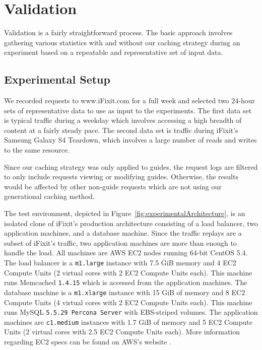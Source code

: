 \documentclass[12pt]{ucthesis}
\begin{document}
\chapter{Validation} \label{validation}
Validation is a fairly straightforward process.
The basic approach involves gathering various statistics with and without our caching strategy during an experiment based on a repeatable and representative set of input data.

\section{Experimental Setup}
We recorded requests to \textsf{www.iFixit.com} for a full week and selected two 24-hour sets of representative data to use as input to the experiments.
The first data set is typical traffic during a weekday which involves accessing a high breadth of content at a fairly steady pace.
The second data set is traffic during \textsf{iFixit}'s Samsung Galaxy S4 Teardown\cite{ifixitGalaxyS4Teardown}, which involves a large number of reads and writes to the same resource.

Since our caching strategy was only applied to guides, the request logs are filtered to only include requests viewing or modifying guides.
Otherwise, the results would be affected by other non-guide requests which are not using our generational caching method.

The test environment, depicted in Figure~\ref{fig:experimentalArchitecture}, is an isolated clone of \textsf{iFixit}'s production architecture consisting of a load balancer, two application machines, and a database machine.
Since the traffic replays are a subset of \textsf{iFixit}'s traffic, two application machines are more than enough to handle the load.
All machines are AWS EC2 nodes running 64-bit CentOS 5.4.
The load balancer is a {\tt m1.large} instance with 7.5 GiB memory and 4 EC2 Compute Units (2 virtual cores with 2 EC2 Compute Units each).
This machine runs \textsf{Memcached} {\tt 1.4.15} which is accessed from the application machines.
The database machine is a {\tt m1.xlarge} instance with 15 GiB of memory and 8 EC2 Compute Units (4 virtual cores with 2 EC2 Compute Units each).
This machine runs \textsf{MySQL} {\tt 5.5.29 Percona Server} with EBS-striped volumes.
The application machines are {\tt c1.medium} instances with 1.7 GiB of memory and 5 EC2 Compute Units (2 virtual cores with 2.5 EC2 Compute Units each).
More information regarding EC2 specs can be found on AWS's website \cite{awsInstanceTypes}.
\end{document}
